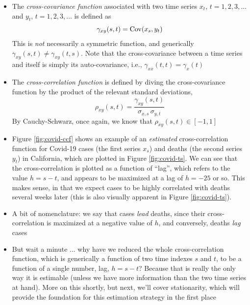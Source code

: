 \documentclass{article}
\begin{document}
\begin{itemize}
\item The \emph{cross-covariance function} associated with two time series $x_t$, 
  $t = 1,2,3,\dots$ and $y_t$, $t = 1,2,3,\dots$ is defined as
  \[
  \gamma_{xy}(s,t) = \operatorname{Cov}(x_s, y_t)
  \]
  This is \emph{not} necessarily a symmetric function, and generically
  $\gamma_{xy}(s,t) \not= \gamma_{xy}(t,s)$. Note that the cross-covariance
  between a time series and itself is simply its auto-covariance, i.e.,
  $\gamma_{xx}(t,t) = \gamma_x(t)$

\item The \emph{cross-correlation function} is defined by diving the
  cross-covariance function by the product of the relevant standard deviations, 
  \[
  \rho_{xy}(s,t) = \frac{\gamma_{xy}(s,t)}{\sigma_{x,s} \, \sigma_{y,t}}
  \]
  By Cauchy-Schwarz, once again, we know that $\rho_{xy}(s,t) \in [-1,1]$

\item Figure \ref{fig:covid-ccf} shows an example of an \emph{estimated} 
  cross-correlation function for Covid-19 cases (the first series $x_s$) and 
  deaths (the second series $y_t$) in California, which are plotted in Figure
  \ref{fig:covid-ts}. We can see that the cross-correlation is plotted as a
  function of ``lag'', which refers to the value $h = s-t$, and appears to be  
  maximized at a lag of $h = -25$ or so. This makes sense, in that we expect
  cases to be highly correlated with deaths several weeks later (this is also
  visually apparent in Figure \ref{fig:covid-ts}). 

\item A bit of nomenclature: we say that cases \emph{lead} deaths, since their
  cross-correlation is maximized at a negative value of $h$, and conversely, 
  deaths \emph{lag} cases  

\item  But wait a minute ... why have we reduced the whole cross-correlation 
  function, which is generically a function of two time indexes $s$ and $t$, to
  be a function of a single number, lag, $h = s-t$? Because that is really the
  only way it is estimable (unless we have more information than the two time
  series at hand). More on this shortly, but next, we'll cover stationarity,
  which will provide the foundation for this estimation strategy in the first
  place 
\end{itemize}
\end{document}
